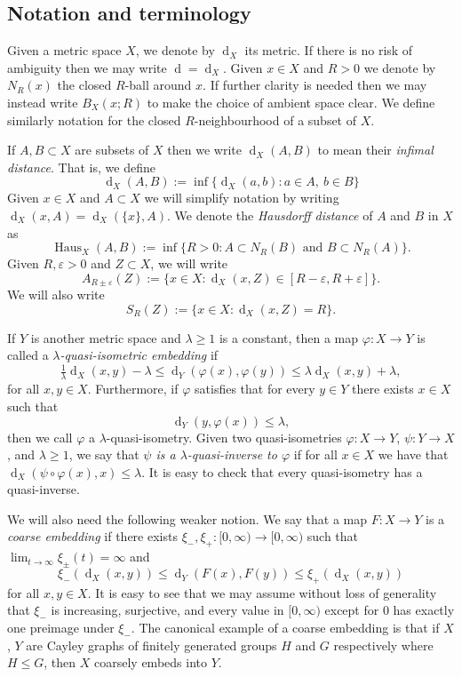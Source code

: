 \documentclass[10pt,a4paper]{amsart}
\DeclareMathOperator{\dHaus}{Haus}
\DeclareMathOperator{\dist}{d}
\theoremstyle{definition}
\begin{document}
\subsection{Notation and terminology}



Given a metric space $X$, we denote by $\dist_X$ its metric. If there is no risk of ambiguity then we may write $\dist = \dist_X$. Given $x \in X$ and $R > 0$ we denote by $N_R(x)$ the closed $R$-ball around $x$. If further clarity is needed then we may instead write $B_X(x;R)$ to make the choice of ambient space clear. We define similarly notation for the closed $R$-neighbourhood of a subset of $X$.

If $A, B \subset X$ are subsets of $X$ then we write $\dist_X(A,B)$ to mean their \textit{infimal distance}. That is, we define
$$
\dist_X(A,B) := \inf \{\dist_X(a,b) : a \in A, \ b \in B\}
$$
Given $x \in X$ and $A \subset X$ we will simplify notation by writing $\dist_X(x, A) = \dist_X(\{x\}, A)$. 
We denote the \textit{Hausdorff distance} of $A$ and $B$ in $X$ as 
$$
\dHaus_X(A,B) := \inf \{R >0 : A \subset N_R(B) \text{ and } B \subset N_R(A) \}.
$$
Given $R, \varepsilon > 0$ and $Z \subset X$, we will write
$$
A_{R \pm \varepsilon}(Z) := \{x \in X : \dist_X(x, Z) \in [R-\varepsilon, R+\varepsilon] \}. 
$$
We will also write 
$$
S_{R}(Z) := \{x \in X : \dist_X(x, Z) = R \}.
$$

If $Y$ is another metric space and $\lambda \geq 1$ is a constant, then a map $\varphi : X \to Y$ is called a \textit{$\lambda$-quasi-isometric embedding} if 
$$
\tfrac 1 \lambda \dist_X(x,y) - \lambda \leq \dist_Y(\varphi(x), \varphi(y)) \leq \lambda \dist_X(x,y) + \lambda,
$$
for all $x, y \in X$.
Furthermore, if $\varphi$ satisfies that for every $y \in Y$ there exists $x \in X$ such that 
$$
\dist_Y(y, \varphi(x)) \leq \lambda,
$$
then we call $\varphi$ a $\lambda$-quasi-isometry. Given two quasi-isometries $\varphi : X \to Y$, $\psi : Y \to X$, and $\lambda \geq 1$, we say that \emph{$\psi$ is a $\lambda$-quasi-inverse to $\varphi$} if for all $x \in X$ we have that $\dist_X(\psi \circ \varphi(x), x) \leq \lambda$.  It is easy to check that every quasi-isometry has a quasi-inverse. 

We will also need the following weaker notion. We say that a map $F : X \to Y$ is a \textit{coarse embedding} if there exists $\xi_-, \xi_+ : [0,\infty) \to [0,\infty)$ such that 
$
\lim_{t \to \infty} \xi_\pm (t) = \infty
$
and 
$$
\xi_-(\dist_X(x, y)) \leq \dist_Y(F(x), F(y)) \leq \xi_+(\dist_X(x, y))
$$
for all $x, y \in X$. It is easy to see that we may assume without loss of generality that $\xi_-$ is increasing, surjective, and every value in $[0,\infty)$ except for 0 has exactly one preimage under $\xi_-$. The canonical example of a coarse embedding is that if $X$, $Y$ are Cayley graphs of finitely generated groups $H$ and $G$ respectively where $H \leq G$, then $X$ coarsely embeds into $Y$. 
\end{document}
